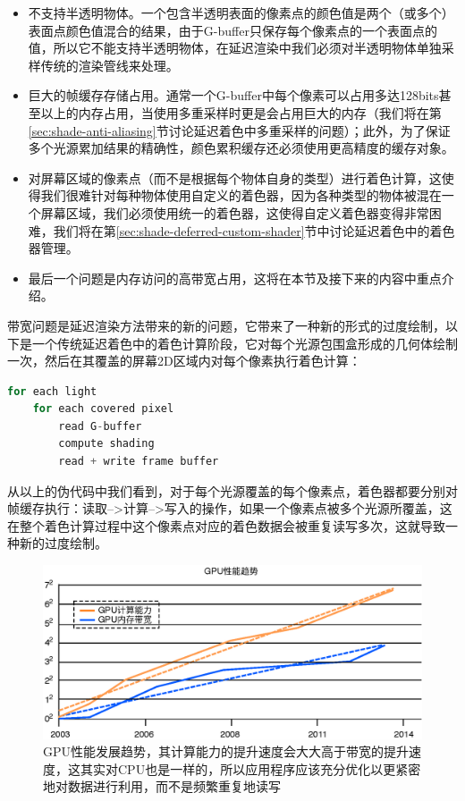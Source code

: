 \begin{itemize}
	\item 不支持半透明物体。一个包含半透明表面的像素点的颜色值是两个（或多个）表面点颜色值混合的结果，由于G-buffer只保存每个像素点的一个表面点的值，所以它不能支持半透明物体，在延迟渲染中我们必须对半透明物体单独采样传统的渲染管线来处理。
	\item 巨大的帧缓存存储占用。通常一个G-buffer中每个像素可以占用多达128bits甚至以上的内存占用，当使用多重采样时更是会占用巨大的内存（我们将在第\ref{sec:shade-anti-aliasing}节讨论延迟着色中多重采样的问题）；此外，为了保证多个光源累加结果的精确性，颜色累积缓存还必须使用更高精度的缓存对象。
	\item 对屏幕区域的像素点（而不是根据每个物体自身的类型）进行着色计算，这使得我们很难针对每种物体使用自定义的着色器，因为各种类型的物体被混在一个屏幕区域，我们必须使用统一的着色器，这使得自定义着色器变得非常困难，我们将在第\ref{sec:shade-deferred-custom-shader}节中讨论延迟着色中的着色器管理。
	\item 最后一个问题是内存访问的高带宽占用，这将在本节及接下来的内容中重点介绍。
\end{itemize}

带宽问题是延迟渲染方法带来的新的问题，它带来了一种新的形式的过度绘制，以下是一个传统延迟着色中的着色计算阶段，它对每个光源包围盒形成的几何体绘制一次，然后在其覆盖的屏幕2D区域内对每个像素执行着色计算：

\begin{lstlisting}[language=C++]
for each light
	for each covered pixel
		read G-buffer
		compute shading
		read + write frame buffer
\end{lstlisting}

从以上的伪代码中我们看到，对于每个光源覆盖的每个像素点，着色器都要分别对帧缓存执行：读取-->计算-->写入的操作，如果一个像素点被多个光源所覆盖，这在整个着色计算过程中这个像素点对应的着色数据会被重复读写多次，这就导致一种新的过度绘制。

\begin{figure}
	\includegraphics[width=1.\textwidth]{figures/shade/gpu-trends}
	\caption{GPU性能发展趋势，其计算能力的提升速度会大大高于带宽的提升速度，这其实对CPU也是一样的，所以应用程序应该充分优化以更紧密地对数据进行利用，而不是频繁重复地读写}
	\label{f:shade-gpu-trends}
\end{figure}

